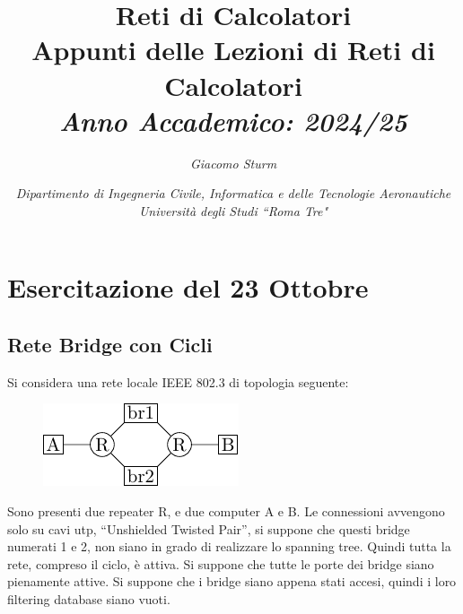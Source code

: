 \documentclass{article}
\numberwithin{equation}{subsection}
\begin{document}
\title{%
    \textbf{Reti di Calcolatori}  \\ 
    \large Appunti delle Lezioni di Reti di Calcolatori \\
    \textit{Anno Accademico: 2024/25}}
\author{\textit{Giacomo Sturm}}
\date{\textit{Dipartimento di Ingegneria Civile, Informatica e delle Tecnologie Aeronautiche \\
Università degli Studi ``Roma Tre"}}

\maketitle
\thispagestyle{link}

\clearpage


\pagestyle{fancy}
\fancyhead{}\fancyfoot{}
\fancyfoot[C]{\thepage}

\tableofcontents

\clearpage
{}

\section{Esercitazione del 23 Ottobre}

\subsection{Rete Bridge con Cicli}

Si considera una rete locale IEEE 802.3 di topologia seguente:

\begin{figure}[H]%
    \centering%
    \includegraphics[scale=1.25]{rete_bridge_cicli.pdf}%
\end{figure}

Sono presenti due repeater R, e due computer A e B. Le connessioni avvengono solo su cavi utp, ``Unshielded Twisted Pair'', si suppone che questi 
bridge numerati 1 e 2, non siano in grado di realizzare lo spanning tree. Quindi tutta la rete, compreso il ciclo, è attiva. Si suppone che tutte 
le porte dei bridge siano pienamente attive. 
Si suppone che i bridge siano appena stati accesi, quindi i loro filtering database siano vuoti. 
\end{document}
